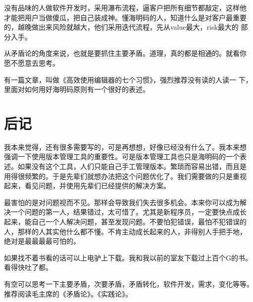 \documentclass[10pt]{article}
\begin{document}
\begin{CJK*}{UTF8}{simsun}
没有品味的人做软件开发时，采用瀑布流程，逼客户把所有细节都敲定，这样他
才能把用户当做傻瓜，把自己装成神。懂海明码的人，知道什么是对客户最重要
的，越晚做出来风险就越大，他们采用迭代流程，先从value最大，risk最大的
部分入手。

从矛盾论的角度来说，也就是要抓住主要矛盾。道理，真的都是相通的。就看你
愿不愿意去思考。

有一篇文章，叫做《高效使用编辑器的七个习惯》，强烈推荐没有读的人读一
下，里面对如何用好海明码原则有一个很好的表述。

\section{后记}

我本来觉得，还有很多需要写的，可是再想想，好像已经没有什么了。我本来想
强调一下使用版本管理工具的重要性。可是版本管理工具也只是海明码的一个表
述。如果没有这个工具，人们只能自己手工管理版本。繁琐而容易出错，而且是
用得很频繁的。于是先辈们就想办法把这个问题优化了。我们需要做的只是重视
起来，看见问题，并使用先辈们已经提供的解决方案。

最害怕的是对问题视而不见。那样会导致我们失去很多机会。本来你可以成为解
决一个问题的第一人，结果错过，太可惜了。尤其是新程序员，一定要快点成长
起来，能自己一个人解决问题，甚至发现问题。不要怕犯错误，最怕不犯错误的
人，那样的人其实他什么都不懂。不肯主动成长起来的人，非得别人手把手地，
绝对是最最最最可怕的。

如果找不着书看的话可以上电驴上下载。我和我以前的室友下载过上百个G的书。
看得快吐了都。

有空可以思考一下主要矛盾，次要矛盾，矛盾转化，软件开发，需求，变化等等。
推荐阅读毛主席的《矛盾论》。《实践论》。


\end{CJK*}
\end{document}
